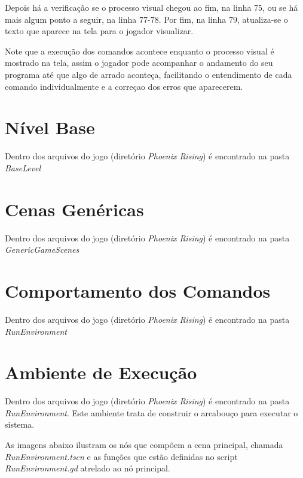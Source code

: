 Depois há a verificação se o processo visual chegou ao fim, na linha 75, ou 
se há mais algum ponto a seguir, na linha 77-78. Por fim, na linha 79,
atualiza-se o texto que aparece na tela para o jogador visualizar.

Note que a execução dos comandos acontece enquanto o processo visual é mostrado
na tela, assim o jogador pode acompanhar o andamento do seu programa até que
algo de arrado aconteça, facilitando o entendimento de cada comando 
individualmente e a correçao dos erros que aparecerem.

\section{Nível Base}

Dentro dos arquivos do jogo (diretório \textit{Phoenix Rising}) é encontrado na
pasta \textit{BaseLevel}

\section{Cenas Genéricas}

Dentro dos arquivos do jogo (diretório \textit{Phoenix Rising}) é encontrado na
pasta \textit{GenericGameScenes}

\section{Comportamento dos Comandos}

Dentro dos arquivos do jogo (diretório \textit{Phoenix Rising}) é encontrado na
pasta \textit{RunEnvironment}

\section{Ambiente de Execução}

Dentro dos arquivos do jogo (diretório \textit{Phoenix Rising}) é encontrado na
pasta \textit{RunEnvironment}. Este ambiente trata de construir o arcabouço 
para executar o sistema.

As imagens abaixo ilustram os nós que compõem a cena principal, chamada 
\textit{RunEnvironment.tscn} e as funções que estão definidas no script
\textit{RunEnvironment.gd} atrelado ao nó principal.

